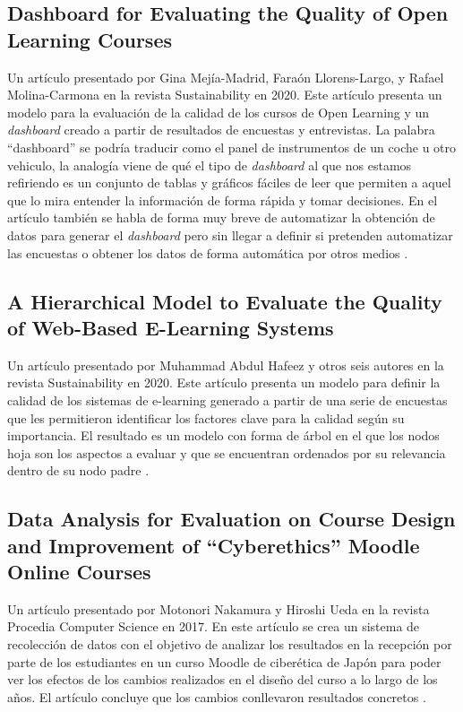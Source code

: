 \subsection{Dashboard for Evaluating the Quality of Open Learning Courses}
Un artículo presentado por Gina Mejía-Madrid, Faraón Llorens-Largo, y Rafael Molina-Carmona en la revista Sustainability en 2020.
Este artículo presenta un modelo para la evaluación de la calidad de los cursos de Open Learning y un \textit{dashboard} creado a partir de resultados de encuestas y entrevistas. La palabra ``dashboard'' se podría traducir como el panel de instrumentos de un coche u otro vehiculo, la analogía viene de qué el tipo de \textit{dashboard} al que nos estamos refiriendo es un conjunto de tablas y gráficos fáciles de leer que permiten a aquel que lo mira entender la información de forma rápida y tomar decisiones. En el artículo también se habla de forma muy breve de automatizar la obtención de datos para generar el \textit{dashboard} pero sin llegar a definir si pretenden automatizar las encuestas o obtener los datos de forma automática por otros medios \cite{mejia2020dashboard}.

\subsection{A Hierarchical Model to Evaluate the Quality of Web-Based E-Learning Systems}
Un artículo presentado por Muhammad Abdul Hafeez y otros seis autores en la revista Sustainability en 2020.
Este artículo presenta un modelo para definir la calidad de los sistemas de e-learning generado a partir de una serie de encuestas que les permitieron identificar los factores clave para la calidad según su importancia. El resultado es un modelo con forma de árbol en el que los nodos hoja son los aspectos a evaluar y que se encuentran ordenados por su relevancia dentro de su nodo padre \cite{muhammad2020hierarchical}.

\subsection{Data Analysis for Evaluation on Course Design and Improvement of “Cyberethics” Moodle Online Courses}
Un artículo presentado por Motonori Nakamura y Hiroshi Ueda en la revista Procedia Computer Science en 2017.
En este artículo se crea un sistema de recolección de datos con el objetivo de analizar los resultados en la recepción por parte de los estudiantes en un curso Moodle de ciberética de Japón para poder ver los efectos de los cambios realizados en el diseño del curso a lo largo de los años. El artículo concluye que los cambios conllevaron resultados concretos \cite{ueda2017data}.


